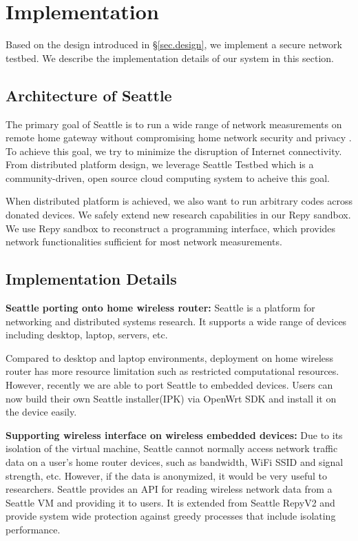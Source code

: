 \section{Implementation} 
\label{sec.implementation}

Based on the design introduced in \S{\ref{sec.design}}, we implement a 
secure network testbed. We describe the implementation details of our system 
in this section.

\subsection{Architecture of Seattle}
The primary goal of Seattle is to run a wide range of network measurements 
on remote home gateway without compromising home network security and privacy
. To achieve this goal, we try to minimize the disruption of Internet 
connectivity. From distributed platform design, we leverage Seattle Testbed 
which is a community-driven, open source cloud computing system to acheive 
this goal. 

When distributed platform is achieved, we also want to run arbitrary codes 
across donated devices. We safely extend new research capabilities in our 
Repy sandbox. We use Repy sandbox to reconstruct a programming interface, 
which provides network functionalities sufficient for most network 
measurements.

\subsection{Implementation Details}
\textbf{Seattle porting onto home wireless router:} 
Seattle is a platform for networking and distributed systems 
research. It supports a wide range of devices including desktop, laptop, 
servers, etc.

Compared to desktop and laptop environments, deployment on home wireless 
router has more resource limitation such as restricted computational 
resources. However, recently we are able to port Seattle to embedded devices.
Users can now build their own Seattle installer(IPK) via OpenWrt SDK and 
install it on the device easily. 

\textbf{Supporting wireless interface on wireless embedded devices:} 
Due to its isolation of the virtual machine, Seattle cannot normally access 
network traffic data on a user's home router devices, such as bandwidth, 
WiFi SSID and signal strength, etc. However, if the data is anonymized, it 
would be very useful to researchers. Seattle provides an API for reading 
wireless network data from a Seattle VM and providing it to users. It is 
extended from Seattle RepyV2 and provide system wide protection against 
greedy processes that include isolating performance. 

